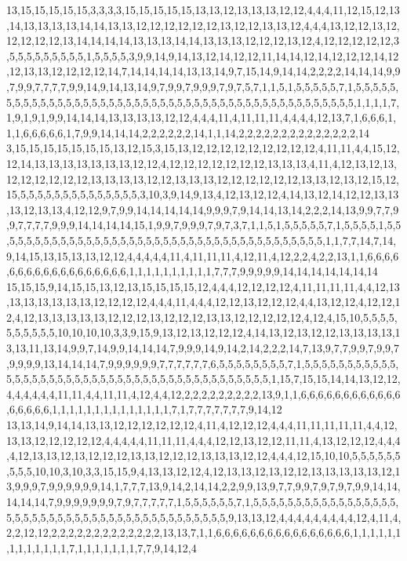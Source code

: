 13,15,15,15,15,15,3,3,3,3,15,15,15,15,15,13,13,12,13,13,13,12,12,4,4,4,11,12,15,12,13,14,13,13,13,13,14,14,13,13,12,12,12,12,12,12,13,12,12,13,13,12,4,4,4,13,12,12,13,12,12,12,12,12,13,14,14,14,14,13,13,13,14,14,13,13,13,12,12,12,13,12,4,12,12,12,12,12,3,5,5,5,5,5,5,5,5,5,1,5,5,5,5,3,9,9,14,9,14,13,12,14,12,12,11,14,14,12,14,12,12,12,14,12,12,13,13,12,12,12,12,14,7,14,14,14,14,13,13,14,9,7,15,14,9,14,14,2,2,2,2,14,14,14,9,9,7,9,9,7,7,7,7,9,9,14,9,14,13,14,9,7,9,9,7,9,9,9,7,9,7,5,7,1,1,5,1,5,5,5,5,5,7,1,5,5,5,5,5,5,5,5,5,5,5,5,5,5,5,5,5,5,5,5,5,5,5,5,5,5,5,5,5,5,5,5,5,5,5,5,5,5,5,5,5,5,5,5,5,5,1,1,1,1,7,1,9,1,9,1,9,9,14,14,14,13,13,13,13,12,12,4,4,4,11,4,11,11,11,4,4,4,4,12,13,7,1,6,6,6,1,1,1,6,6,6,6,6,1,7,9,9,14,14,14,2,2,2,2,2,2,14,1,1,14,2,2,2,2,2,2,2,2,2,2,2,2,2,2,14
3,15,15,15,15,15,15,15,13,12,15,3,15,13,12,12,12,12,12,12,12,12,12,4,11,11,4,4,15,12,12,14,13,13,13,13,13,13,13,12,12,4,12,12,12,12,12,12,12,13,13,13,4,11,4,12,13,12,13,12,12,12,12,12,12,13,13,13,13,12,12,13,13,13,12,12,12,12,12,12,13,13,12,13,12,15,12,15,5,5,5,5,5,5,5,5,5,5,5,5,5,5,3,10,3,9,14,9,13,4,12,13,12,12,4,14,13,12,14,12,12,13,13,13,12,13,13,4,12,12,9,7,9,9,14,14,14,14,14,9,9,9,7,9,14,14,13,14,2,2,2,14,13,9,9,7,7,9,9,7,7,7,7,9,9,9,14,14,14,14,15,1,9,9,7,9,9,9,7,9,7,3,7,1,1,5,1,5,5,5,5,5,7,1,5,5,5,5,1,5,5,5,5,5,5,5,5,5,5,5,5,5,5,5,5,5,5,5,5,5,5,5,5,5,5,5,5,5,5,5,5,5,5,5,5,5,5,5,1,1,7,7,14,7,14,9,14,15,13,15,13,13,12,12,4,4,4,4,4,11,4,11,11,11,4,12,11,4,12,2,2,4,2,2,13,1,1,6,6,6,6,6,6,6,6,6,6,6,6,6,6,6,6,6,6,1,1,1,1,1,1,1,1,1,1,7,7,7,9,9,9,9,9,14,14,14,14,14,14,14
15,15,15,9,14,15,15,13,12,13,15,15,15,15,12,4,4,4,12,12,12,12,4,11,11,11,11,4,4,12,13,13,13,13,13,13,13,12,12,12,12,4,4,4,11,4,4,4,12,12,13,12,12,12,4,4,13,12,12,4,12,12,12,4,12,13,13,13,13,13,12,12,12,13,12,12,12,13,13,12,12,12,12,12,4,12,4,15,10,5,5,5,5,5,5,5,5,5,5,10,10,10,10,3,3,9,15,9,13,12,13,12,12,12,4,14,13,12,13,12,12,13,13,13,13,13,13,11,13,14,9,9,7,14,9,9,14,14,14,7,9,9,9,14,9,14,2,14,2,2,2,14,7,13,9,7,7,9,9,7,9,9,7,9,9,9,9,13,14,14,14,7,9,9,9,9,9,9,7,7,7,7,7,7,6,5,5,5,5,5,5,5,5,7,1,5,5,5,5,5,5,5,5,5,5,5,5,5,5,5,5,5,5,5,5,5,5,5,5,5,5,5,5,5,5,5,5,5,5,5,5,5,5,5,5,5,5,1,15,7,15,15,14,14,13,12,12,4,4,4,4,4,4,11,11,4,4,11,11,4,12,4,4,12,2,2,2,2,2,2,2,2,2,13,9,1,1,6,6,6,6,6,6,6,6,6,6,6,6,6,6,6,6,6,1,1,1,1,1,1,1,1,1,1,1,1,1,1,7,1,7,7,7,7,7,7,7,9,14,12
13,13,14,9,14,14,13,13,12,12,12,12,12,12,4,11,4,12,12,12,4,4,4,11,11,11,11,11,4,4,12,13,13,12,12,12,12,12,4,4,4,4,4,11,11,11,4,4,4,12,12,13,12,12,11,11,4,13,12,12,12,4,4,4,4,12,13,13,12,13,12,12,12,13,13,12,12,12,13,13,13,12,12,4,4,4,12,15,10,10,5,5,5,5,5,5,5,5,5,10,10,3,10,3,3,15,15,9,4,13,13,12,12,4,12,13,13,12,13,12,12,13,13,13,13,13,12,13,9,9,9,7,9,9,9,9,9,9,14,1,7,7,7,13,9,14,2,14,14,2,2,9,9,13,9,7,7,9,9,7,9,7,9,7,9,9,14,14,14,14,14,7,9,9,9,9,9,9,9,7,9,7,7,7,7,7,1,5,5,5,5,5,5,7,1,5,5,5,5,5,5,5,5,5,5,5,5,5,5,5,5,5,5,5,5,5,5,5,5,5,5,5,5,5,5,5,5,5,5,5,5,5,5,5,5,5,5,5,9,13,13,12,4,4,4,4,4,4,4,4,4,12,4,11,4,2,2,12,12,2,2,2,2,2,2,2,2,2,2,2,2,2,13,13,7,1,1,6,6,6,6,6,6,6,6,6,6,6,6,6,6,6,6,1,1,1,1,1,1,1,1,1,1,1,1,1,7,1,1,1,1,1,1,1,7,7,9,14,12,4
